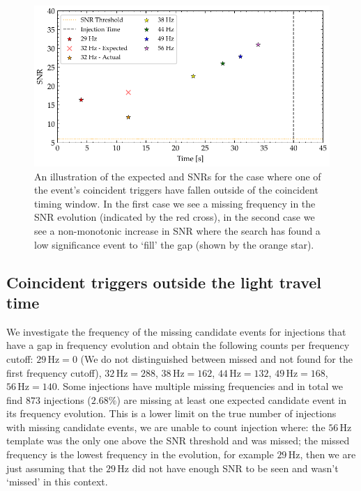 \begin{figure}
       \centering
    \includegraphics[width=\textwidth]{images/6_earlywarning/identified-problems/non_mono_snr.pdf}
    \caption{An illustration of the expected and SNRs for the case where one of the event's coincident triggers have fallen outside of the coincident timing window. In the first case we see a missing frequency in the SNR evolution (indicated by the red cross), in the second case we see a non-monotonic increase in SNR where the search has found a low significance event to `fill' the gap (shown by the orange star).}
    \label{6:fig:non-monotonic-snr}
\end{figure}

\subsection{\label{6:sec:light-travel-time}Coincident triggers outside the light travel time}

We investigate the frequency of the missing candidate events for injections that have a gap in frequency evolution and obtain the following counts per frequency cutoff: $29 \, \text{Hz} = 0$ (We do not distinguished between missed and not found for the first frequency cutoff), $32 \, \text{Hz} = 288$, $38 \, \text{Hz} = 162$, $44 \, \text{Hz} = 132$, $49 \, \text{Hz} = 168$, $56 \, \text{Hz} = 140$. Some injections have multiple missing frequencies and in total we find $873$ injections ($2.68\%$) are missing at least one expected candidate event in its frequency evolution. This is a lower limit on the true number of injections with missing candidate events, we are unable to count injection where: the $56 \, \text{Hz}$ template was the only one above the SNR threshold and was missed; the missed frequency is the lowest frequency in the evolution, for example $29 \, \text{Hz}$, then we are just assuming that the $29 \, \text{Hz}$ did not have enough SNR to be seen and wasn't `missed' in this context.

